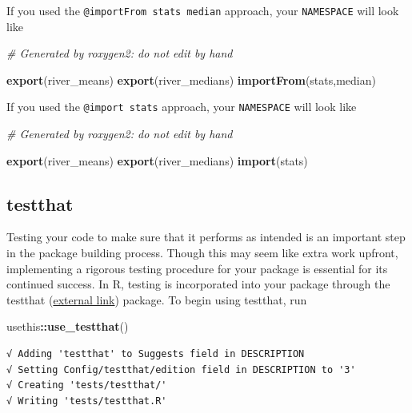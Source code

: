 \documentclass[
]{book}
\newenvironment{Shaded}{\begin{snugshade}}{\end{snugshade}}
\newcommand{\CommentTok}[1]{\textcolor[rgb]{0.56,0.35,0.01}{\textit{#1}}}
\newcommand{\KeywordTok}[1]{\textcolor[rgb]{0.13,0.29,0.53}{\textbf{#1}}}
\newcommand{\NormalTok}[1]{#1}
\newcommand{\OperatorTok}[1]{\textcolor[rgb]{0.81,0.36,0.00}{\textbf{#1}}}
\begin{document}
If you used the \texttt{@importFrom\ stats\ median} approach, your \texttt{NAMESPACE} will look like

\begin{Shaded}
\begin{Highlighting}[]
\CommentTok{# Generated by roxygen2: do not edit by hand}

\KeywordTok{export}\NormalTok{(river_means)}
\KeywordTok{export}\NormalTok{(river_medians)}
\KeywordTok{importFrom}\NormalTok{(stats,median)}
\end{Highlighting}
\end{Shaded}

If you used the \texttt{@import\ stats} approach, your \texttt{NAMESPACE} will look like

\begin{Shaded}
\begin{Highlighting}[]
\CommentTok{# Generated by roxygen2: do not edit by hand}

\KeywordTok{export}\NormalTok{(river_means)}
\KeywordTok{export}\NormalTok{(river_medians)}
\KeywordTok{import}\NormalTok{(stats)}
\end{Highlighting}
\end{Shaded}

\hypertarget{testthat}{%
\subsection{testthat}\label{testthat}}

Testing your code to make sure that it performs as intended is an important step in the package building process. Though this may seem like extra work upfront, implementing a rigorous testing procedure for your package is essential for its continued success. In R, testing is incorporated into your package through the testthat (\href{https://testthat.r-lib.org/}{external link}) package. To begin using testthat, run

\begin{Shaded}
\begin{Highlighting}[]
\NormalTok{usethis}\OperatorTok{::}\KeywordTok{use_testthat}\NormalTok{()}
\end{Highlighting}
\end{Shaded}

\begin{verbatim}
√ Adding 'testthat' to Suggests field in DESCRIPTION
√ Setting Config/testthat/edition field in DESCRIPTION to '3'
√ Creating 'tests/testthat/'
√ Writing 'tests/testthat.R'
\end{verbatim}
\end{document}
